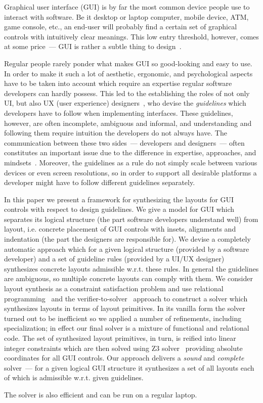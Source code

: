 
Graphical user interface (GUI) is by far the most common device people use to interact with software. Be it desktop
or laptop computer, mobile device, ATM, game console, etc., an end-user will probably find a certain set
of graphical controls with intuitively clear meanings. This low entry threshold, however, comes at some
price~--- GUI is rather a subtle thing to design~\cite{UI1}.

Regular people rarely ponder what makes GUI so good-looking and easy to use. In order to make it such a lot of
aesthetic, ergonomic, and psychological aspects have to be taken into account which require an expertise
regular software developers can hardly possess. This led to the establishing the roles of not only UI, but also UX
(user experience) designers~\cite{UI5}, who devise the \emph{guidelines} which developers have to
follow when implementing interfaces. These guidelines, however, are often incomplete, ambiguous and informal, and understanding
and following them require intuition the developers do not always have.  The communication between these two
sides~--- developers and designers~---  often constitutes an important issue due to the difference in
expertise, approaches, and mindsets~\cite{UI6}. Moreover, the guidelines as a rule
do not simply scale between various devices or even screen resolutions, so in order to support all desirable
platforms a developer might have to follow different guidelines separately.

In this paper we present a framework for synthesizing the layouts for GUI controls with respect to design guidelines. We give a model for GUI
which separates its logical structure (the part software developers understand well) from layout, i.e. concrete placement
of GUI controls with insets, alignments and indentation (the part the designers are responsible for). We devise a completely automatic approach
which for a given logical structure (provided by a software developer) and a set of guideline rules (provided by a UI/UX designer) synthesizes
concrete layouts admissible w.r.t. these rules. In general the guidelines are ambiguous, so multiple concrete layouts can
comply with them. We consider layout synthesis as a constraint satisfaction problem and use relational programming~\cite{TRS}
and the verifier-to-solver~\cite{searchproblems} approach to construct a solver which synthesizes layouts in terms of layout primitives. In its
vanilla form the solver turned out to be inefficient so we applied a number of refinements, including specialization; in effect our
final solver is a mixture of functional and relational code. The set of synthesized layout primitives, in turn, is reified into linear
integer constraints which are then solved using \textsc{Z3} solver~\cite{Zthree} providing absolute coordinates for all GUI controls.
Our approach delivers a \emph{sound} and \emph{complete} solver~--- for a given logical GUI structure it synthesizes a set of all layouts each of which is
admissible w.r.t. given guidelines.

The solver is also efficient and can be run on a regular laptop.

